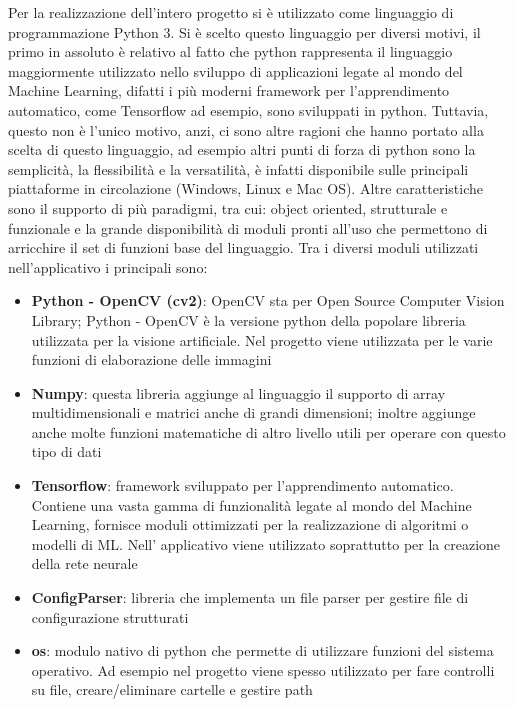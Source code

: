 Per la realizzazione dell’intero progetto si è utilizzato come linguaggio di programmazione Python 3. Si è scelto questo linguaggio per diversi motivi, il primo in assoluto è relativo al fatto che python rappresenta il linguaggio maggiormente utilizzato nello sviluppo di applicazioni legate al mondo del Machine Learning, difatti i più moderni framework per l’apprendimento automatico, come Tensorflow ad esempio, sono sviluppati in python. Tuttavia, questo non è l’unico motivo, anzi, ci sono altre ragioni che hanno portato alla scelta di questo linguaggio, ad esempio altri punti di forza di python sono la semplicità, la flessibilità e la versatilità, è infatti disponibile sulle principali piattaforme in circolazione (Windows, Linux e Mac OS). Altre caratteristiche sono il supporto di più paradigmi, tra cui: object oriented, strutturale e funzionale e la grande disponibilità di moduli pronti all’uso che permettono di arricchire il set di funzioni base del linguaggio. Tra i diversi moduli utilizzati nell’applicativo i principali sono:
\begin{itemize}
  \item \textbf{Python - OpenCV (cv2)}:  OpenCV sta per Open Source Computer Vision Library; Python - OpenCV è la versione python della popolare libreria utilizzata per la visione artificiale. Nel progetto viene utilizzata per le varie funzioni di elaborazione delle immagini
  \item \textbf{Numpy}: questa libreria aggiunge al linguaggio il supporto di array multidimensionali e matrici anche di grandi dimensioni; inoltre aggiunge anche molte funzioni matematiche di altro livello utili per operare con questo tipo di dati
  \item \textbf{Tensorflow}: framework sviluppato per l’apprendimento automatico. Contiene una vasta gamma di funzionalità legate al mondo del Machine Learning, fornisce moduli ottimizzati per la realizzazione di algoritmi o modelli di ML. Nell’ applicativo viene utilizzato soprattutto per la creazione della rete neurale
  \item \textbf{ConfigParser}: libreria che implementa un file parser per gestire file di configurazione strutturati
  \item \textbf{os}: modulo nativo di python che permette di utilizzare funzioni del sistema operativo. Ad esempio nel progetto viene spesso utilizzato per fare controlli su file, creare/eliminare cartelle e gestire path
\end{itemize}

